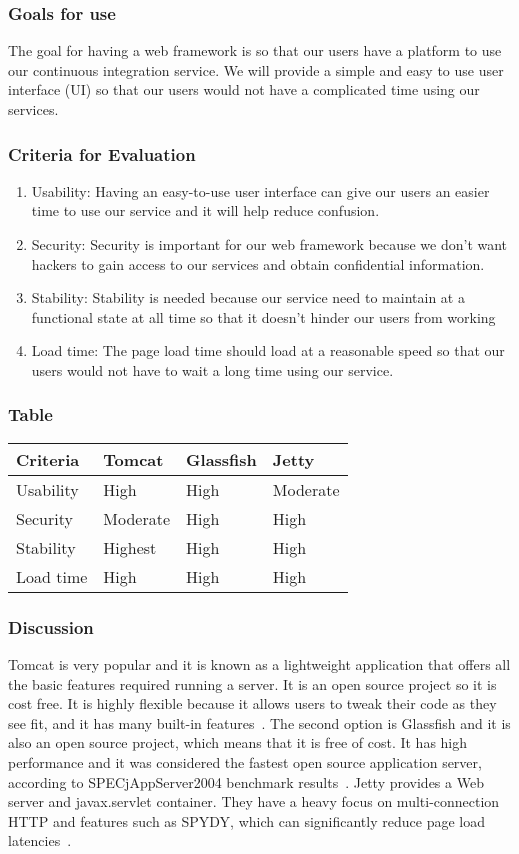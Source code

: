 \documentclass[10pt,letterpaper,onecolumn,draftclsnofoot]{IEEEtran}
\begin{document}
\subsubsection{Goals for use}
The goal for having a web framework is so that our users have a platform to use our continuous integration service.
We will provide a simple and easy to use user interface (UI) so that our users would not have a complicated time using our services.
\subsubsection{Criteria for Evaluation}
\begin{enumerate}
  \item Usability: Having an easy-to-use user interface can give our users an easier time to use our service and it will help reduce confusion.
  \item Security: Security is important for our web framework because we don't want hackers to gain access to our services and obtain confidential information.
  \item Stability: Stability is needed because our service need to maintain at a functional state at all time so that it doesn't hinder our users from working
  \item Load time: The page load time should load at a reasonable speed so that our users would not have to wait a long time using our service.
\end{enumerate}
\subsubsection{Table}
\begin{center}
  \begin{tabular}{llll}
    Criteria & Tomcat & Glassfish & Jetty \\ \midrule
    Usability       & High & High & Moderate \\ \midrule
    Security           & Moderate & High & High \\ \midrule
    Stability      & Highest & High & High \\ \midrule
    Load time  & High & High & High \\ \bottomrule
  \end{tabular}
\end{center}
\subsubsection{Discussion}
Tomcat is very popular and it is known as a lightweight application that offers all the basic features required running a server.
It is an open source project so it is cost free.
It is highly flexible because it allows users to tweak their code as they see fit, and it has many built-in features~\cite{tomcat}.
The second option is Glassfish and it is also an open source project, which means that it is free of cost.
It has high performance and it was considered the fastest open source application server, according to SPECjAppServer2004 benchmark results~\cite{glassfish}.
Jetty provides a Web server and javax.servlet container.
They have a heavy focus on multi-connection HTTP and features such as SPYDY, which can significantly reduce page load latencies~\cite{jetty}.
\end{document}
